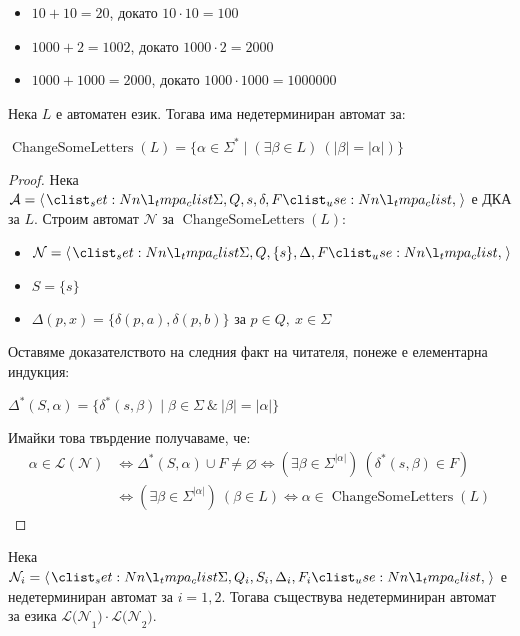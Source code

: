 \begin{itemize}
    \item $10 + 10 = 20$, докато $10 \cdot 10 = 100$
    \item $1000 + 2 = 1002$, докато $1000 \cdot 2 = 2000$
    \item $1000 + 1000 = 2000$, докато $1000 \cdot 1000 = 1000000$
\end{itemize}

\begin{claim}
    Нека $L$ е автоматен език.
    Тогава има недетерминиран автомат за:
    \begin{center}
        $\operatorname{ChangeSomeLetters}(L) = \{ \alpha \in \Sigma^* \mid (\exists \beta \in L) \: (|\beta| = |\alpha| ) \}$
    \end{center}
\end{claim}

\begin{proof}
    Нека $\mathcal{A} = \opair{\Sigma, Q, s, \delta, F}$ е ДКА за $L$.
    Строим автомат $\mathcal{N}$ за $\operatorname{ChangeSomeLetters}(L)$:
    \begin{itemize}
        \item $\mathcal{N} = \opair{\Sigma, Q, \{ s \}, \Delta, F}$
        \item $S = \{ s \}$
        \item $\Delta(p, x) = \{ \delta(p, a), \delta(p, b) \}$ за $p \in Q, \: x \in \Sigma$
    \end{itemize}

    Оставяме доказателството на следния факт на читателя, понеже е елементарна индукция:
    \begin{center}
        $\Delta^*(S, \alpha) = \{ \delta^*(s, \beta) \mid \beta \in \Sigma \: \& \: |\beta| = |\alpha| \}$
    \end{center}

    Имайки това твърдение получаваме, че:
    \begin{align*}
        \alpha \in \mathcal{L(N)} & \iff \Delta^*(S, \alpha) \cup F \neq \varnothing \iff (\exists \beta \in \Sigma^{|\alpha|}) \: (\delta^*(s, \beta) \in F) \\
                                  & \iff (\exists \beta \in \Sigma^{|\alpha|}) \: (\beta \in L) \iff \alpha \in \operatorname{ChangeSomeLetters}(L)
    \end{align*}
\end{proof}

\begin{claim}
    Нека $\mathcal{N}_i = \opair{\Sigma, Q_i, S_i, \Delta_i, F_i}$  е недетерминиран автомат за $i = 1, 2$.
    Тогава съществува недетерминиран автомат за езика $\mathcal{L(N}_1) \cdot \mathcal{L(N}_2)$.
\end{claim}


